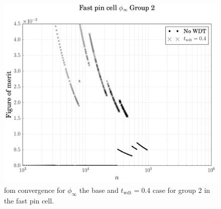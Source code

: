 \begin{figure}[hbtp]
  \centering
  \includegraphics[scale=0.5]{images/results/fast_inf_flx_example}
  \caption[\Acrshort{fom} convergence for $\phi_{\infty}$ for the base
  and $t_{\mathrm{wdt}} = 0.4$ case for group 2.]{\Acrshort{fom} convergence for
    $\phi_{\infty}$ the base and $t_{\mathrm{wdt}} = 0.4$ case for
    group 2 in the fast pin cell.}
  \label{fig:fast_inf_flx_example}
\end{figure}

